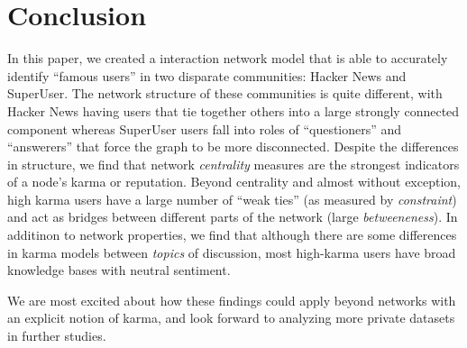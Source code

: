 \documentclass[11pt]{article}
\begin{document}
\section{Conclusion}
In this paper, we created a interaction network model that is able to accurately 
identify ``famous users'' in two disparate communities: Hacker News and
SuperUser. The network structure of these communities is quite different, with
Hacker News having users that tie together others into a large strongly
connected component whereas SuperUser users fall into roles of ``questioners''
and ``answerers'' that force the graph to be more disconnected. Despite the
differences in structure, we find that network \textit{centrality} measures are
the strongest indicators of a node's karma or reputation. Beyond centrality and 
almost without exception, high karma users have a large number of ``weak ties''
(as measured by \textit{constraint}) and act as bridges between 
different parts of the network (large \textit{betweeneness}). In additinon to
network properties, we find that although there are some differences in karma
models between \textit{topics} of discussion, most high-karma users have broad
knowledge bases with neutral sentiment. 

We are most excited about how these findings could apply beyond networks with an
explicit notion of karma, and look forward to analyzing more private datasets in
further studies.

{} 
\end{document}
